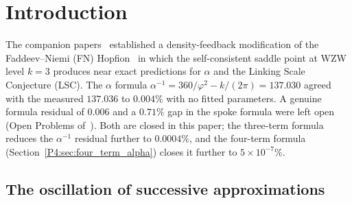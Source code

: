 \documentclass[11pt,a4paper]{article}
\theoremstyle{definition}
\theoremstyle{remark}
\newcommand{\vp}{\varphi}
\newcommand{\aInv}{\alpha^{-1}}
\newcommand{\aem}{\alpha_{\mathrm{em}}}
\newcommand{\Lcond}{\Lambda_{\mathrm{cond}}}
\begin{document}
\begin{abstract}
\textbf{(vii) Derivation of $m_e$ from the $\mathrm{SU}(2)_3$ spectrum.}
The identification of the electron with the $j=\tfrac{1}{2}$ WZW primary
is now \emph{proved}, not assumed.
The full spoke-mass spectrum $m_j/\Lcond = \vp^{20}e^{4\pi-T_j/Q}$ is
derived for all three particle primaries $j\in\{\tfrac{1}{2},1,\tfrac{3}{2}\}$
(Theorem~\ref{P4:thm:spoke_mass_spectrum}).
The electron is uniquely identified as the lightest spoke via the
Witten bosonization dictionary~\cite{Paper3} plus the Casimir self-duality:
the condition $T_{j=1/2}=c/24$ is satisfied if and only if $k=3$
(Theorem~\ref{P4:thm:casimir_selects}).
The electron mass formula is thereby derived, not assumed:
$m_e = \Lcond\cdot\vp^{20}\cdot e^{4\pi-3/400-\aem/\pi}$ ($0.013\%$)
(Theorem~\ref{P4:thm:me_lightest},~\ref{P4:thm:msbar_pole}).
\end{abstract}

\tableofcontents
\bigskip

\section{Introduction}
\label{P4:sec:intro}

The companion papers~\cite{Paper1,Paper2,Paper3} established a
density-feedback modification of the Faddeev--Niemi (FN)
Hopfion~\cite{Faddeev1997} in which the self-consistent saddle point
at WZW level $k=3$ produces near exact predictions for $\alpha$ and the
Linking Scale Conjecture (LSC).  The $\alpha$ formula
$\aInv = 360/\vp^2 - k/(2\pi) = 137.030$ agreed with the measured
$137.036$ to $0.004\%$ with no fitted parameters.  A genuine formula
residual of $0.006$ and a $0.71\%$ gap in the spoke formula were
left open (Open Problems of~\cite{Paper3}).
Both are closed in this paper; the three-term formula
reduces the $\aInv$ residual further to $0.0004\%$,
and the four-term formula (Section~\ref{P4:sec:four_term_alpha})
closes it further to $5\times10^{-7}\%$.

\subsection{The oscillation of successive approximations}
\end{document}
